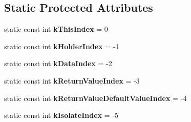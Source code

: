 \subsection*{Static Protected Attributes}
\begin{DoxyCompactItemize}
\item 
\hypertarget{classv8_1_1_property_callback_info_a715d28b9c57a581de1698673c9b9eb8a}{}static const int {\bfseries k\+This\+Index} = 0\label{classv8_1_1_property_callback_info_a715d28b9c57a581de1698673c9b9eb8a}

\item 
\hypertarget{classv8_1_1_property_callback_info_a8598985473483dfadba4e4c67251675b}{}static const int {\bfseries k\+Holder\+Index} = -\/1\label{classv8_1_1_property_callback_info_a8598985473483dfadba4e4c67251675b}

\item 
\hypertarget{classv8_1_1_property_callback_info_a39fc5d6aaccb2916af503c7120ab99c5}{}static const int {\bfseries k\+Data\+Index} = -\/2\label{classv8_1_1_property_callback_info_a39fc5d6aaccb2916af503c7120ab99c5}

\item 
\hypertarget{classv8_1_1_property_callback_info_ae16cdf2c6ce787b21d94953cd514ed0e}{}static const int {\bfseries k\+Return\+Value\+Index} = -\/3\label{classv8_1_1_property_callback_info_ae16cdf2c6ce787b21d94953cd514ed0e}

\item 
\hypertarget{classv8_1_1_property_callback_info_a00849f770023891d1466176f5e0c8539}{}static const int {\bfseries k\+Return\+Value\+Default\+Value\+Index} = -\/4\label{classv8_1_1_property_callback_info_a00849f770023891d1466176f5e0c8539}

\item 
\hypertarget{classv8_1_1_property_callback_info_a59ba899cb580bc5e8adca6f799db3e2a}{}static const int {\bfseries k\+Isolate\+Index} = -\/5\label{classv8_1_1_property_callback_info_a59ba899cb580bc5e8adca6f799db3e2a}

\end{DoxyCompactItemize}
